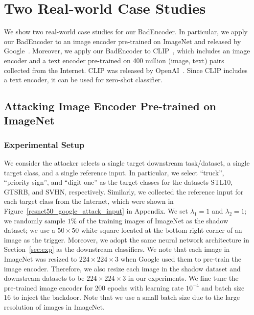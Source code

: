 \section{Two Real-world Case Studies}
We show two real-world case studies for our BadEncoder. In particular, we apply our BadEncoder to an image encoder pre-trained on ImageNet and released by Google~\cite{chen2020simple}. Moreover, we apply our BadEncoder to CLIP~\cite{radford2021learning}, which includes an image encoder and a text encoder pre-trained on 400 million (image, text) pairs collected from the Internet. CLIP was released by OpenAI~\cite{clip_url}. Since CLIP includes a text encoder, it can be used for zero-shot classifier. 



\subsection{Attacking Image Encoder Pre-trained on ImageNet}
\subsubsection{Experimental Setup} 
\label{experimental_setup_imagenet}
We consider the attacker selects a single target downstream task/dataset, a single target class, and a single reference input. In particular, we select ``truck'', ``priority sign'', and ``digit one'' as the target classes for the datasets STL10, GTSRB, and SVHN, respectively. Similarly, we collected the reference input for each target class from the Internet, which were shown in Figure~\ref{resnet50_google_attack_input} in Appendix. We set $\lambda_1 = 1$ and $\lambda_2 = 1$; we randomly sample $1\%$ of the training images of ImageNet as the shadow dataset; we use a $50 \times 50$ white square located at the bottom right corner of an image as the trigger. Moreover, we adopt the same neural network architecture in Section~\ref{sec:exp} as the downstream classifiers. We note that each image in ImageNet  was resized to $224 \times 224 \times 3$ when Google used them to pre-train the image encoder. Therefore, we also resize each image in the shadow dataset and downstream datasets to be $224 \times 224 \times 3$ in our experiments.  We fine-tune the pre-trained image encoder for 200 epochs with learning rate $10^{-4}$ and batch size $16$ to inject the backdoor. Note that we use a small batch size due to the large resolution of images in ImageNet. 





